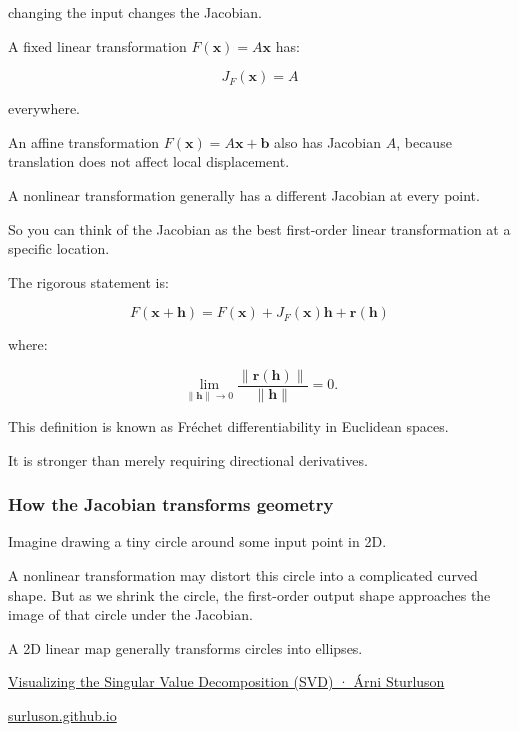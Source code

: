 changing the input changes the Jacobian.

A fixed linear transformation \(F(\mathbf x)=A\mathbf x\) has:

\[
J_F(\mathbf x)=A
\]

everywhere.

An affine transformation \(F(\mathbf x)=A\mathbf x+\mathbf b\) also has Jacobian \(A\), because translation does not affect local displacement.

A nonlinear transformation generally has a different Jacobian at every point.

So you can think of the Jacobian as the best first-order linear transformation at a specific location.

The rigorous statement is:

\[
F(\mathbf x+\mathbf h) = F(\mathbf x)+J_F(\mathbf x)\mathbf h+\mathbf r(\mathbf h)
\]

where:

\[
\lim_{\|\mathbf h\|\to0} \frac{\|\mathbf r(\mathbf h)\|}{\|\mathbf h\|}=0.
\]

This definition is known as Fréchet differentiability in Euclidean spaces.

It is stronger than merely requiring directional derivatives.

\subsubsection{How the Jacobian transforms geometry}\label{02-foundations-ii-ch021-how-the-jacobian-transforms-geometry}

\hypertarget{02-foundations-ii-ch021-how-the-jacobian-transforms-geometry}{}

Imagine drawing a tiny circle around some input point in 2D.

A nonlinear transformation may distort this circle into a complicated curved shape. But as we shrink the circle, the first-order output shape approaches the image of that circle under the Jacobian.

A 2D linear map generally transforms circles into ellipses.

\href{https://images.openai.com/static-rsc-4/snh-e19GotRQocePDuoqQRldKi909Wv3Ghn6oy7qF4vh-DmEyMU0aOYOrfy6z9hhcRviS00W0fgYnoU6OnDjUJDqI_E0F7jsn5R4hOfc-E6wNdPAnQTW2qd7NnlpFlxmOrTHzMeuPAv3DS5XmKmuNKw19bkuYGpa9H3DCFJSaeA?purpose=inline}{Visualizing the Singular Value Decomposition (SVD) · Árni Sturluson}

\href{https://surluson.github.io/blog/2021/01/11/visualizing-svd/?utm_source=chatgpt.com}{surluson.github.io}

